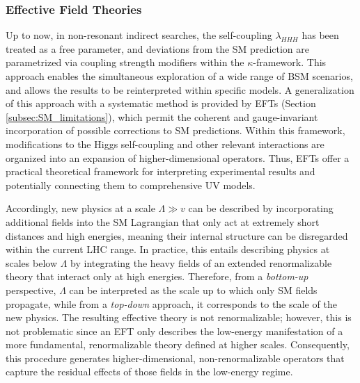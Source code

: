 \subsubsection{Effective Field Theories}
\label{subsubsec:EFT_frameworks}
%
Up to now, in non-resonant indirect searches, the self-coupling $\lambda_{HHH}$ has been treated as a free parameter, and deviations from the SM prediction are parametrized via coupling strength modifiers within the $\kappa$-framework. This approach enables the simultaneous exploration of a wide range of BSM scenarios, and allows the results to be reinterpreted within specific models. A generalization of this approach with a systematic method is provided by EFTs (Section \ref{subsec:SM_limitations}), which permit the coherent and gauge-invariant incorporation of possible corrections to SM predictions. Within this framework, modifications to the Higgs self-coupling and other relevant interactions are organized into an expansion of higher-dimensional operators. Thus, EFTs offer a practical theoretical framework for interpreting experimental results and potentially connecting them to comprehensive UV models.


Accordingly, new physics at a scale $\Lambda \gg v$ can be described by incorporating additional fields into the SM Lagrangian that only act at extremely short distances and high energies, meaning their internal structure can be disregarded within the current LHC range. In practice, this entails describing physics at scales below $\Lambda$ by integrating the heavy fields of an extended renormalizable theory that interact only at high energies. Therefore, from a \textit{bottom-up} perspective, $\Lambda$ can be interpreted as the scale up to which only SM fields propagate, while from a \textit{top-down} approach, it corresponds to the scale of the new physics. The resulting effective theory is not renormalizable; however, this is not problematic since an EFT only describes the low-energy manifestation of a more fundamental, renormalizable theory defined at higher scales. Consequently, this procedure generates higher-dimensional, non-renormalizable operators that capture the residual effects of those fields in the low-energy regime.\medskip

